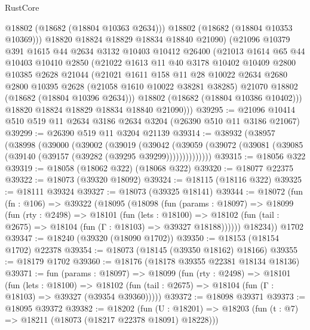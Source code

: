 \begin{lexlean}{RustCore}
\begin{coremodule}
            @18802
            (@18682 (@18804 @10363 @2634)))
          @18802
          (@18682 (@18804 @10353 @10369)))
        @18820
        @18824
        @18829
        @18834
        @18840
        @21090)
      (@21096
        @10379
        @391
        @1615
        @44
        @2634
        @3132
        @10403
        @10412
        @26400
        (@21013
          @1614
          @65
          @44
          @10403
          @10410
          @2850
          (@21022
            @1613
            @11
            @40
            @3178
            @10402
            @10409
            @2800
            @10385
            @2628
            @21044
            (@21021
              @1611
              @158
              @11
              @28
              @10022
              @2634
              @2680
              @2800
              @10395
              @2628
              (@21058 @1610 @10022 @38281 @38285)
              @21070
              @18802
              (@18682 (@18804 @10396 @2634)))
            @18802
            (@18682 (@18804 @10386 @10402)))
          @18820
          @18824
          @18829
          @18834
          @18840
          @21090)))
@39295 := @21096 @10414 @510 @519 @11 @2634 @3186 @2634 @3204 (@26390 @510 @11 @3186 @21067)
@39299 := @26390 @519 @11 @3204 @21139
@39314 := @38932
    (@38957
      (@38998
        (@39000
          (@39002
            (@39019
              (@39042
                (@39059 (@39072 (@39081 (@39085 (@39140 (@39157 (@39282 (@39295 @39299))))))))))))))
@39315 := @18056 @322
@39319 := @18058 (@18062 @322) (@18068 @322)
@39320 := @18077 @22375
@39322 := @18073 (@39320 @18092)
@39324 := @18115 (@18116 @322)
@39325 := @18111 @39324
@39327 := @18073 (@39325 @18141)
@39344 := @18072
    (fun (fn : @106) =>
    @39322
      (@18095
        (@18098
          (fun (params : @18097) =>
          @18099
            (fun (rty : @2498) =>
            @18101
              (fun (lets : @18100) =>
              @18102 (fun (tail : @2675) => @18104 (fun (Γ : @18103) => @39327 @18188))))))
        @18234))
    @1702
@39347 := @18240 (@39320 (@18090 @1702))
@39350 := @18153 (@18154 @1702) @22378
@39354 := @18073 (@18145 (@39350 @18162) @18166)
@39355 := @18179 @1702
@39360 := @18176 (@18178 @39355 @22381 @18134 @18136)
@39371 := fun (params : @18097) =>
  @18099
    (fun (rty : @2498) =>
    @18101
      (fun (lets : @18100) =>
      @18102 (fun (tail : @2675) => @18104 (fun (Γ : @18103) => @39327 (@39354 @39360)))))
@39372 := @18098 @39371
@39373 := @18095 @39372
@39382 := @18202
    (fun (U : @18201) => @18203 (fun (t : @7) => @18211 (@18073 (@18217 @22378 @18091) @18228)))

\end{coremodule}
\end{lexlean}
